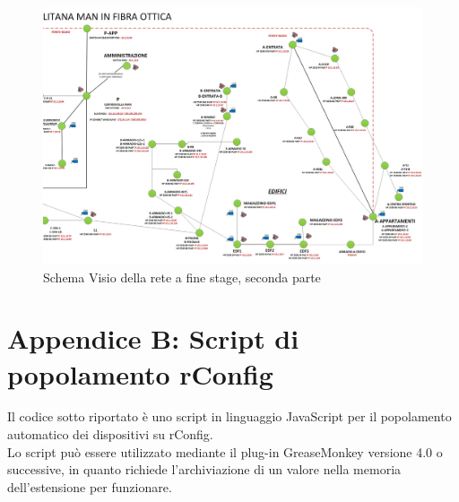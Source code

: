 \documentclass[Tesi.tex]{subfiles}
\begin{document}
\begin{landscape}
\begin{figure}[H]
	\centering
	\includegraphics[width=1\linewidth]{"images/schema_WAN_anonimo_dopo_B"}
	\caption{Schema Visio della rete a fine stage, seconda parte}
	\label{fig:Schema Visio della rete a fine stage, seconda parte}
\end{figure}
\end{landscape}

\label{sec:Appendice B}
\section*{Appendice B: Script di popolamento rConfig}
Il codice sotto riportato è uno script in linguaggio JavaScript per il popolamento automatico dei dispositivi su rConfig. \\
Lo script può essere utilizzato mediante il plug-in GreaseMonkey versione 4.0 o successive, in quanto richiede l'archiviazione di un valore nella memoria dell'estensione per funzionare. \\
\end{document}
